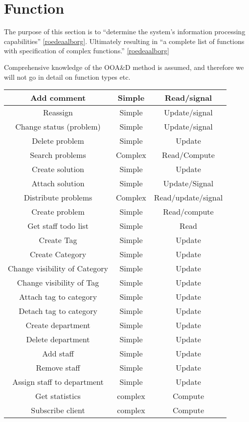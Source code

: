 \section{Function}
The purpose of this section is to ``determine the system's information processing capabilities'' \ref{roedeaalborg}. Ultimately resulting in ``a complete list of functions with specification of complex functions.'' 
\ref{roedeaalborg}

Comprehensive knowledge of the OOA\&D method is assumed, and therefore we will not go in detail on function types etc. 

\begin{table}[h] %

\begin{center}
\begin{tabular}{|c|c|c|}
\hline
Add comment &   Simple & Read/signal   \\ \hline%
Reassign & Simple   & Update/signal \\ \hline%
Change status (problem) &   Simple & Update/signal \\ \hline%
Delete problem & Simple &   Update \\   \hline%
Search problems & Complex &   Read/Compute \\ \hline%
Create solution & Simple &   Update \\   \hline%
Attach solution & Simple &   Update/Signal \\   \hline%
Distribute problems &   Complex & Read/update/signal \\   \hline%
Create problem &   Simple & Read/compute \\   \hline%
Get staff todo list & Simple & Read \\   \hline%
Create Tag & Simple &   Update \\ \hline%
Create Category & Simple & Update \\ \hline%
Change visibility of Category &   Simple &   Update \\   \hline%
Change visibility of Tag &   Simple &  Update \\ \hline%
Attach tag to category & Simple & Update \\ \hline%
Detach tag to category & Simple & Update \\ \hline%
Create department & Simple & Update \\ \hline%
Delete department & Simple & Update \\ \hline%
Add staff & Simple & Update \\ \hline%
Remove staff & Simple & Update \\ \hline%
Assign staff to department & Simple & Update \\ \hline%
Get statistics & complex & Compute \\ \hline%
Subscribe client & complex & Compute \\ \hline%



\end{tabular}
\end{center}
\end{table}
